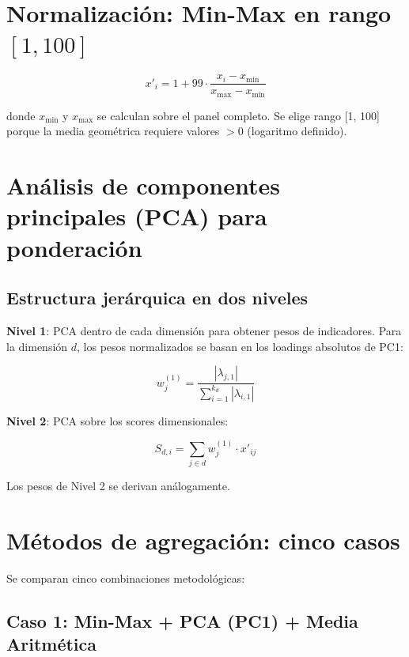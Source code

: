 \section{Normalización: Min-Max en rango $[1, 100]$}

\begin{equation}
    x'_i = 1 + 99 \cdot \frac{x_i - x_{\min}}{x_{\max} - x_{\min}}
\end{equation}

donde $x_{\min}$ y $x_{\max}$ se calculan sobre el panel completo. Se elige rango [1, 100] porque la media geométrica requiere valores $> 0$ (logaritmo definido).

\section{Análisis de componentes principales (PCA) para ponderación}

\subsection{Estructura jerárquica en dos niveles}

\textbf{Nivel 1}: PCA dentro de cada dimensión para obtener pesos de indicadores. Para la dimensión $d$, los pesos normalizados se basan en los loadings absolutos de PC1:

\begin{equation}
    w_{j}^{(1)} = \frac{|\lambda_{j,1}|}{\sum_{i=1}^{k_d} |\lambda_{i,1}|}
\end{equation}

\textbf{Nivel 2}: PCA sobre los scores dimensionales:

\begin{equation}
    S_{d,i} = \sum_{j \in d} w_j^{(1)} \cdot x'_{ij}
\end{equation}

Los pesos de Nivel 2 se derivan análogamente.

\section{Métodos de agregación: cinco casos}

Se comparan cinco combinaciones metodológicas:

\subsection{Caso 1: Min-Max + PCA (PC1) + Media Aritmética}

